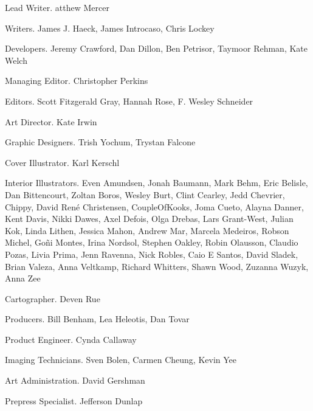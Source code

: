 \documentclass[10pt,a4paper,twoside,bg=print,twocolumn,openany,nodeprecatedcode]{dndbook}
\begin{document}
\begin{description}
\begin{multicols}{2}
\item[Lead Writer.]
atthew Mercer


\item[Writers.]
James J. Haeck, James Introcaso, Chris Lockey

\item[Developers.]
Jeremy Crawford, Dan Dillon, Ben Petrisor, Taymoor Rehman, Kate Welch

\item[Managing Editor.]
Christopher Perkins

\item[Editors.]
Scott Fitzgerald Gray, Hannah Rose, F. Wesley Schneider

\item[Art Director.]
Kate Irwin

\item[Graphic Designers.]
Trish Yochum, Trystan Falcone

\item[Cover Illustrator.]
Karl Kerschl

\item[Interior Illustrators.]
Even Amundsen, Jonah Baumann, Mark Behm, Eric Belisle, Dan Bittencourt, Zoltan Boros, Wesley Burt, Clint Cearley, Jedd Chevrier, Chippy, David René Christensen, CoupleOfKooks, Joma Cueto, Alayna Danner, Kent Davis, Nikki Dawes, Axel Defois, Olga Drebas, Lars Grant-West, Julian Kok, Linda Lithen, Jessica Mahon, Andrew Mar, Marcela Medeiros, Robson Michel, Goñi Montes, Irina Nordsol, Stephen Oakley, Robin Olausson, Claudio Pozas, Livia Prima, Jenn Ravenna, Nick Robles, Caio E Santos, David Sladek, Brian Valeza, Anna Veltkamp, Richard Whitters, Shawn Wood, Zuzanna Wuzyk, Anna Zee

\item[Cartographer.]
Deven Rue

\item[Producers.]
Bill Benham, Lea Heleotis, Dan Tovar

\item[Product Engineer.]
Cynda Callaway

\item[Imaging Technicians.]
Sven Bolen, Carmen Cheung, Kevin Yee

\item[Art Administration.]
David Gershman

\item[Prepress Specialist.]
Jefferson Dunlap


\end{multicols}
\end{description}
\end{document}
